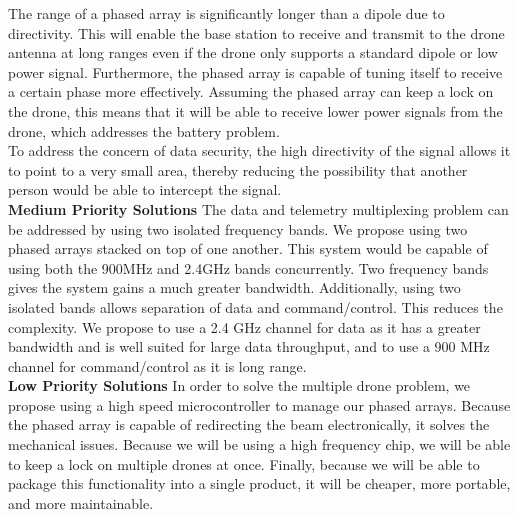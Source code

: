 \documentclass[11pt]{article}
\numberwithin{figure}{section}
\begin{document}
	The range of a phased array is significantly longer than a dipole due to directivity. This will enable the base station to receive and transmit to the drone antenna at long ranges even if the drone only supports a standard dipole or low power signal. Furthermore, the phased array is capable of tuning itself to receive a certain phase more effectively. Assuming the phased array can keep a lock on the drone, this means that it will be able to receive lower power signals from the drone, which addresses the battery problem.  \\
	
	To address the concern of data security, the high directivity of the signal allows it to point to a very small area, thereby reducing the possibility that another person would be able to intercept the signal.\\
	
	\textbf{Medium Priority Solutions}
	The data and telemetry multiplexing problem can be addressed by using two isolated frequency bands. We propose using two phased arrays stacked on top of one another. This system would be capable of using both the 900MHz and 2.4GHz bands concurrently. Two frequency bands gives the system gains a much greater bandwidth.  Additionally, using two isolated bands allows separation of data and command/control. This reduces the complexity. We propose to use a 2.4 GHz channel for data as it has a greater bandwidth and is well suited for large data throughput, and to use a 900 MHz channel for command/control as it is long range. \\
	
	\textbf{Low Priority Solutions}
	In order to solve the multiple drone problem, we propose using a high speed microcontroller to manage our phased arrays. Because the phased array is capable of redirecting the beam electronically, it solves the mechanical issues. Because we will be using a high frequency chip, we will be able to keep a lock on multiple drones at once. Finally, because we will be able to package this functionality into a single product, it will be cheaper, more portable, and more maintainable.
\end{document}
